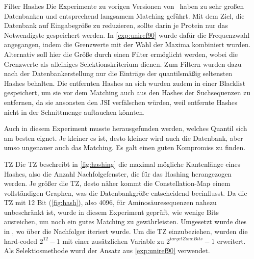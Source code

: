     \begin{experiment}{Filter Hashes} %
        \label{exp:filter_hashes}
        Die Experimente zu vorigen Versionen von \protfin\ haben zu sehr großen Datenbanken und entsprechend langsamem Matching geführt. Mit dem Ziel, die Datenbank auf Eingabegröße zu reduzieren, sollte darin je Protein nur das Notwendigste gespeichert werden. In \autoref{exp:uniref90} wurde dafür die Frequenzwahl angegangen, indem die Grenzwerte mit der Wahl der Maxima kombiniert wurden. Alternativ soll hier die Größe durch einen Filter ermöglicht werden, wobei die Grenzwerte als alleiniges Selektionskriterium dienen. Zum Filtern wurden dazu nach der Datenbankerstellung nur die Einträge der quantilsmäßig seltensten Hashes behalten. Die entfernten Hashes an sich wurden zudem in einer Blacklist gespeichert, um sie vor dem Matching auch aus den Hashes der Suchsequenzen zu entfernen, da sie ansonsten den \ac{JSI} verfälschen würden, weil entfernte Hashes nicht in der Schnittmenge auftauchen könnten.

        Auch in diesem Experiment musste herausgefunden werden, welches Quantil sich am besten eignet. Je kleiner es ist, desto kleiner wird auch die Datenbank, aber umso ungenauer auch das Matching. Es galt einen guten Kompromiss zu finden.
    \end{experiment}
    \begin{experiment}{\acl{TZ}} %
        \label{exp:target_zone}
        Die \ac{TZ} beschreibt in \autoref{fig:hashing} die maximal mögliche Kantenlänge eines Hashes, also die Anzahl Nachfolgefenster, die für das Hashing herangezogen werden. Je größer die \ac{TZ}, desto näher kommt die Constellation-Map einem vollständigen Graphen, was die Datenbankgröße entscheidend beeinflusst. Da die \ac{TZ} mit 12 Bit (\autoref{fig:hash}), also 4096, für Aminosäuresequenzen nahezu unbeschränkt ist, wurde in diesem Experiment geprüft, wie wenige Bits ausreichen, um noch ein gutes Matching zu gewährleisten. Umgesetzt wurde dies in , wo über die Nachfolger iteriert wurde. Um die \ac{TZ} einzubeziehen, wurden die hard-coded $2^{12} - 1$ mit einer zusätzlichen Variable zu $2^{targetZoneBits} - 1$ erweitert. Als Selektiosmethode wurd der Ansatz aus \autoref{exp:uniref90} verwendet.
    \end{experiment}

